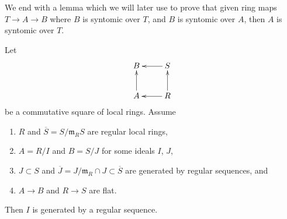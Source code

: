 \noindent
We end with a lemma which we will later use to prove that
given ring maps $T \to A \to B$ where $B$ is syntomic over $T$,
and $B$ is syntomic over $A$, then $A$ is syntomic over $T$.

\begin{lemma}
\label{lemma-lci-permanence-initial}
Let
$$
\xymatrix{
B & S \ar[l] \\
A \ar[u] & R \ar[l] \ar[u]
}
$$
be a commutative square of local rings. Assume
\begin{enumerate}
\item $R$ and $\overline{S} = S/\mathfrak m_R S$ are regular local rings,
\item $A = R/I$ and $B = S/J$ for some ideals $I$, $J$,
\item $J \subset S$ and
$\overline{J} = J/\mathfrak m_R \cap J \subset \overline{S}$
are generated by regular sequences, and
\item $A \to B$ and $R \to S$ are flat.
\end{enumerate}
Then $I$ is generated by a regular sequence.
\end{lemma}

